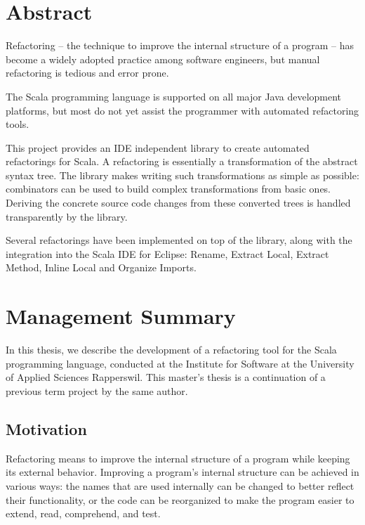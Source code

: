\documentclass[10pt,a4paper,oneside]{scrreprt}
\begin{document}
\emptypage

\chapter*{Abstract}


Refactoring -- the technique to improve the internal structure of a program -- has become a widely adopted practice among software engineers, but manual refactoring is tedious and error prone. 

The Scala programming language is supported on all major Java development platforms, but most do not yet assist the programmer with automated refactoring tools. 

This project provides an IDE independent library to create automated refactorings for Scala. A refactoring is essentially a transformation of the abstract syntax tree. The library makes writing such transformations as simple as possible: combinators can be used to build complex transformations from basic ones. Deriving the concrete source code changes from these converted trees is handled transparently by the library.

Several refactorings have been implemented on top of the library, along with the integration into the Scala IDE for Eclipse: Rename, Extract Local, Extract Method, Inline Local and Organize Imports.

\emptypage

\chapter*{Management Summary}

In this thesis, we describe the development of a refactoring tool for the Scala programming language, conducted at the Institute for Software at the University of Applied Sciences Rapperswil. This master's thesis is a continuation of a previous term project by the same author.

\section*{Motivation}

Refactoring means to improve the internal structure of a program while keeping its external behavior. Improving a program's internal structure can be achieved in various ways: the names that are used internally can be changed to better reflect their functionality, or the code can be reorganized to make the program easier to extend, read, comprehend, and test. 
\end{document}
